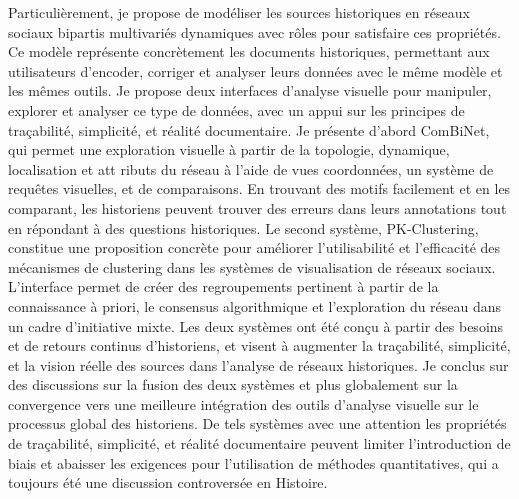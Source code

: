 {    Particulièrement, je propose de modéliser les sources historiques en réseaux sociaux bipartis multivariés dynamiques avec rôles pour satisfaire ces propriétés.
    Ce modèle représente concrètement les documents historiques, permettant aux utilisateurs d'encoder, corriger et analyser leurs données avec le même modèle et les mêmes outils.
    Je propose deux interfaces d'analyse visuelle pour manipuler, explorer et analyser ce type de données, avec un appui sur les principes de traçabilité, simplicité, et réalité documentaire.
    Je présente d'abord ComBiNet, qui permet une exploration visuelle à partir de la topologie, dynamique, localisation et att  ributs du réseau à l'aide de vues coordonnées, un système de requêtes visuelles, et de comparaisons.
    En trouvant des motifs facilement et en les comparant, les historiens peuvent trouver des erreurs dans leurs annotations tout en répondant à des questions historiques.
    Le second système, PK-Clustering, constitue une proposition concrète pour améliorer l'utilisabilité et l'efficacité des mécanismes de clustering dans les systèmes de visualisation de réseaux sociaux.
    L'interface permet de créer des regroupements pertinent à partir de la connaissance à priori, le consensus algorithmique et l'exploration du réseau dans un cadre d'initiative mixte.
    Les deux systèmes ont été conçu à partir des besoins et de retours continus d'historiens, et visent à augmenter la traçabilité, simplicité, et la vision réelle des sources dans l'analyse de réseaux historiques.
    Je conclus sur des discussions sur la fusion des deux systèmes et plus globalement sur la convergence vers une meilleure intégration des outils d'analyse visuelle sur le processus global des historiens.
    De tels systèmes avec une attention les propriétés de traçabilité, simplicité, et réalité documentaire peuvent limiter l'introduction de biais et abaisser les exigences pour l'utilisation de méthodes quantitatives, qui a toujours été une discussion controversée en Histoire.
}


